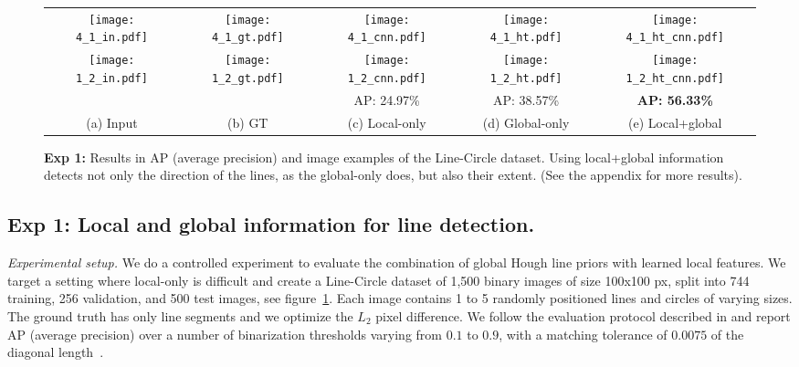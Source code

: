 \documentclass[runningheads]{llncs}
\begin{document}
\begin{figure}[t!]
    \centering
        \begin{tabular}{ccccc}        
            \texttt{[image: 4\_1\_in.pdf]} &
            \texttt{[image: 4\_1\_gt.pdf]} &
            \texttt{[image: 4\_1\_cnn.pdf]} &
            \texttt{[image: 4\_1\_ht.pdf]} &
            \texttt{[image: 4\_1\_ht\_cnn.pdf]}\\
            \texttt{[image: 1\_2\_in.pdf]} &
            \texttt{[image: 1\_2\_gt.pdf]} &
            \texttt{[image: 1\_2\_cnn.pdf]} &
            \texttt{[image: 1\_2\_ht.pdf]} &
            \texttt{[image: 1\_2\_ht\_cnn.pdf]} \\ \cmidrule(r){3-5}
             &  & AP: 24.97\% & AP: 38.57\% & \textbf{AP: 56.33\%} \\ \cmidrule(r){3-5}
             \scriptsize{(a) Input} & \scriptsize{(b) GT} & \scriptsize{(c) Local-only} & \scriptsize{(d) Global-only} & \scriptsize{(e) Local+global} \\             
        \end{tabular} 
       \caption{\textbf{Exp 1:} 
    Results in AP (average precision) and image examples of the Line-Circle dataset. 
    Using local+global information detects not only the direction of the lines, as the global-only does, but also their extent.
    (See the appendix for more results).}
    \label{fig:exp1}
\end{figure}

\subsection{\textbf{Exp 1:}  Local and global information for line detection.}
\label{exp1}
\noindent\emph{Experimental setup.} 
We do a controlled experiment to evaluate the combination of global Hough line priors with learned local features. We target a setting where local-only is difficult and create a Line-Circle dataset of 1,500 binary images of size 100x100 px, split into 744 training, 256 validation, and 500 test images, see figure~\ref{fig:exp1}.
Each image contains 1 to 5 randomly positioned lines and circles of varying sizes. 
The ground truth has only line segments and we optimize the $L_2$ pixel difference.
We follow the evaluation protocol described in \cite{huang2018learning,martin2004learning,maire2008using} and report AP (average precision) over a number of binarization thresholds varying from $0.1$ to $0.9$, with a matching tolerance of $0.0075$ of the diagonal length~\cite{martin2004learning}.
\end{document}

